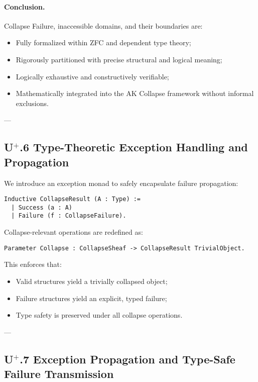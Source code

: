\documentclass[11pt]{article}
\begin{document}
\paragraph{Conclusion.}

Collapse Failure, inaccessible domains, and their boundaries are:

\begin{itemize}
    \item Fully formalized within ZFC and dependent type theory;
    \item Rigorously partitioned with precise structural and logical meaning;
    \item Logically exhaustive and constructively verifiable;
    \item Mathematically integrated into the AK Collapse framework without informal exclusions.
\end{itemize}

---

\subsection*{U$^{+}$.6 Type-Theoretic Exception Handling and Propagation}

We introduce an exception monad to safely encapsulate failure propagation:

\begin{lstlisting}[language=Coq]
Inductive CollapseResult (A : Type) :=
  | Success (a : A)
  | Failure (f : CollapseFailure).
\end{lstlisting}

Collapse-relevant operations are redefined as:

\begin{lstlisting}[language=Coq]
Parameter Collapse : CollapseSheaf -> CollapseResult TrivialObject.
\end{lstlisting}

This enforces that:

\begin{itemize}
    \item Valid structures yield a trivially collapsed object;
    \item Failure structures yield an explicit, typed failure;
    \item Type safety is preserved under all collapse operations.
\end{itemize}

---

\subsection*{U$^{+}$.7 Exception Propagation and Type-Safe Failure Transmission}
\end{document}
